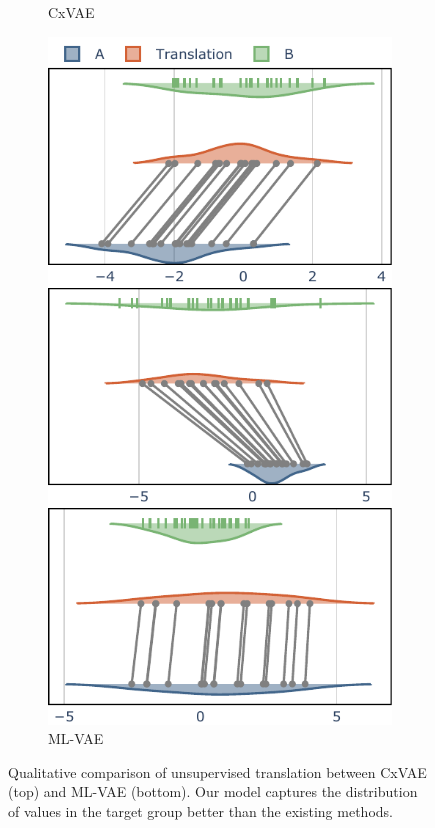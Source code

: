 \documentclass[nohyperref]{article}
\theoremstyle{plain}
\theoremstyle{definition}
\theoremstyle{remark}
\begin{document}
\begin{figure}[ht]
\begin{center}
\begin{subfigure}{0.49\columnwidth}
    \caption{CxVAE}
    \label{fig:first}
\end{subfigure}
\hfill
\begin{subfigure}{0.49\columnwidth}
    \includegraphics[width=\textwidth]{files/data_trans.pdf}
    \caption{ML-VAE}
    \label{fig:second}
\end{subfigure}
    \caption{Qualitative comparison of unsupervised translation between CxVAE (top) and ML-VAE \citep{Bouchacourt2018MultiLevelVA} (bottom). Our model captures the distribution of values in the target group better than the existing methods.}
    \label{qualitative}
    \end{center}
    \vskip -0.2in
\end{figure}
\end{document}
